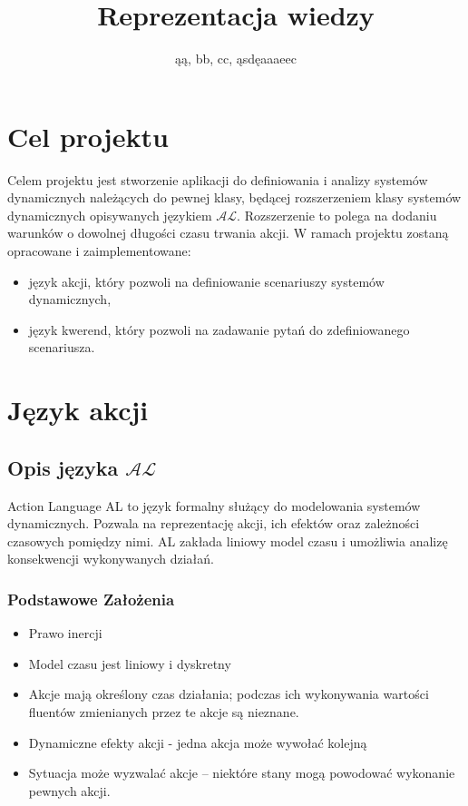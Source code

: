 \documentclass{article}
\title{Reprezentacja wiedzy}
\author{ąą, bb, cc, ąsdęaaaeec}
\begin{document}
\maketitle
\tableofcontents

\newpage

\section{Cel projektu}
Celem projektu jest stworzenie aplikacji do definiowania i analizy systemów dynamicznych należących do pewnej klasy, będącej rozszerzeniem klasy systemów dynamicznych opisywanych językiem $\mathcal{AL}$.
Rozszerzenie to polega na dodaniu warunków o dowolnej długości czasu trwania akcji. W ramach projektu zostaną opracowane i zaimplementowane:
\begin{itemize}
	\item język akcji, który pozwoli na definiowanie scenariuszy systemów dynamicznych,
	\item język kwerend, który pozwoli na zadawanie pytań do zdefiniowanego scenariusza.
\end{itemize}	


\section{Język akcji}

\subsection{Opis języka $\mathcal{AL}$}
Action Language AL to język formalny służący do modelowania systemów dynamicznych. Pozwala na reprezentację akcji, ich efektów oraz zależności czasowych pomiędzy nimi. AL zakłada liniowy model czasu i umożliwia analizę konsekwencji wykonywanych działań.

\subsubsection{Podstawowe Założenia}
\begin{itemize}
    \item Prawo inercji
    \item Model czasu jest liniowy i dyskretny
    \item Akcje mają określony czas działania; podczas ich wykonywania wartości fluentów zmienianych przez te akcje są nieznane.
    \item Dynamiczne efekty akcji - jedna akcja może wywołać kolejną
    \item Sytuacja może wyzwalać akcje – niektóre stany mogą powodować wykonanie pewnych akcji.
\end{itemize}
\end{document}
